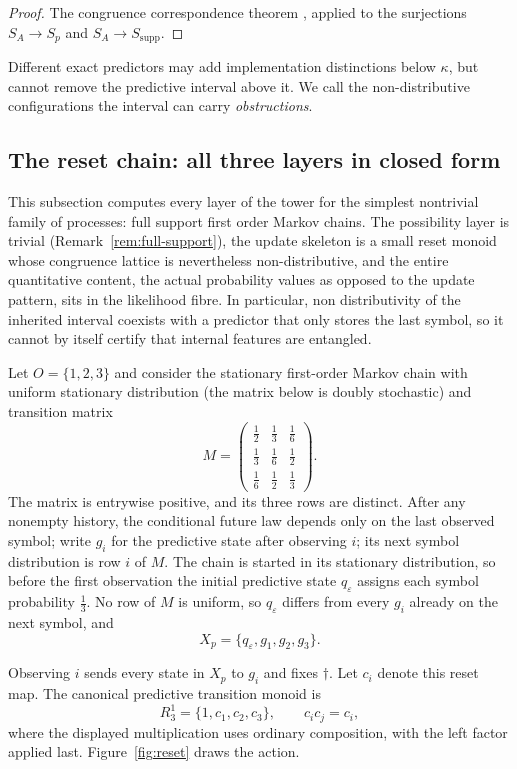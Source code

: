\documentclass[10pt]{article}
\theoremstyle{definition}
\theoremstyle{remark}
\newcommand{\Obs}{O}
\newcommand{\eps}{\varepsilon}
\begin{document}
\begin{proof}
The congruence correspondence theorem \cite{Howie1995}, applied to
the surjections $S_A\to S_p$ and $S_A\to S_{\mathrm{supp}}$.
\end{proof}

Different exact predictors may add implementation distinctions below
$\kappa$, but cannot remove the predictive interval above it.  We
call the non-distributive configurations the interval can carry
\emph{obstructions}.

\subsection{The reset chain: all three layers in closed form}
\label{sec:reset}

This subsection computes every layer of the tower for the simplest
nontrivial family of processes: full support first order Markov
chains. The possibility layer is
trivial (Remark~\ref{rem:full-support}), the update skeleton is a small
reset monoid whose congruence lattice is nevertheless non-distributive,
and the entire quantitative content, the actual probability values as
opposed to the update pattern, sits in the likelihood fibre.  In
particular, non distributivity of the inherited interval coexists with
a predictor that only stores the last symbol, so it cannot by itself
certify that internal features are entangled.

Let $\Obs=\{1,2,3\}$ and consider the stationary first-order Markov chain with
uniform stationary distribution (the matrix below is doubly stochastic)
and transition matrix
\[
  M=
  \begin{pmatrix}
    \frac12&\frac13&\frac16\\[2pt]
    \frac13&\frac16&\frac12\\[2pt]
    \frac16&\frac12&\frac13
  \end{pmatrix}.
\]
The matrix is entrywise positive, and its three rows are distinct.  After
any nonempty history, the conditional future
law depends only on the last observed symbol; write $g_i$ for the
predictive state after observing $i$; its next symbol distribution is
row $i$ of $M$.  The chain is started in its stationary distribution, so before the first
observation the initial predictive state $q_\eps$ assigns each symbol
probability $\tfrac13$.  No row of $M$ is uniform, so $q_\eps$ differs
from every $g_i$ already on the next symbol, and
\[
  X_p=\{q_\eps,g_1,g_2,g_3\}.
\]

Observing $i$ sends every state in $X_p$ to $g_i$ and fixes $\dagger$.  Let
$c_i$ denote this reset map.  The canonical predictive transition monoid is
\[
  R_3^1=\{1,c_1,c_2,c_3\},
  \qquad c_i c_j=c_i,
\]
where the displayed multiplication uses ordinary composition, with the left
factor applied last.  Figure~\ref{fig:reset} draws the action.
\end{document}
